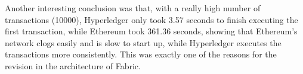 Another interesting conclusion was that, with a really high number of transactions (10000), Hyperledger only took 3.57 seconds to finish executing the first transaction, while Ethereum took 361.36 seconds, showing that Ethereum's network clogs easily and is slow to start up, while Hyperledger executes the transactions more consistently. This was exactly one of the reasons for the revision in the architecture of Fabric.

